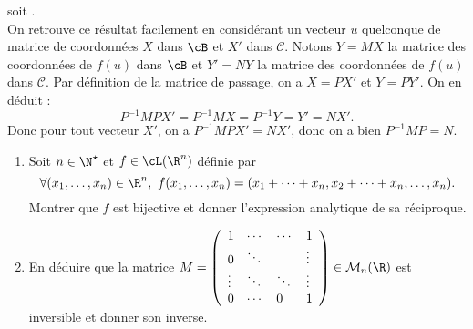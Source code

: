 \documentclass[a4paper, 11pt,reqno]{article}
\begin{document}
\begin{correction}
\begin{enumerate}
		      soit .\\
		      On retrouve ce r\'esultat facilement en consid\'erant un vecteur $u$ quelconque de matrice de coordonn\'ees $X$ dans $\cB$ et $X'$ dans $\mathcal{C}$. Notons $Y=MX$ la matrice des coordonn\'ees de $f(u)$ dans $\cB$ et $Y'=NY$  la matrice des coordonn\'ees de $f(u)$ dans $\mathcal{C}$. Par d\'efinition de la matrice de passage, on a  $X=P X'$ et $Y=PY'$. On en d\'eduit :
		      $$P^{-1} M P X' = P^{-1} M X = P^{-1} Y = Y'= NX'.$$
		      Donc pour tout vecteur $X'$, on a $P^{-1} M P X' = NX'$, donc on a bien $P^{-1}MP=N$.
	\end{enumerate}
\end{correction}
\begin{exercice}  \;
	\begin{enumerate}
		\item Soit $n\in\N^{\star}$ et $f\in\cL(\R^n)$ d\'efinie par
		      $$\forall (x_1,\dots, x_n)\in\R^n,\ f(x_1,\dots, x_n)=(x_1+\dots+x_n, x_2+\dots+x_n,\dots,x_n).$$
		      Montrer que $f$ est bijective et donner l'expression analytique de sa r\'eciproque.
		\item En d\'eduire que la matrice $M=\left(\begin{array}{llll} 1&\cdots&\cdots&1 \\ 0&\ddots& &\vdots \\ \vdots&\ddots&\ddots&\vdots\\ 0&\cdots&0&1        \end{array}\right)\in\mathcal{M}_n(\R)$ est inversible et donner son inverse.
	\end{enumerate}
\end{exercice}
\end{document}
